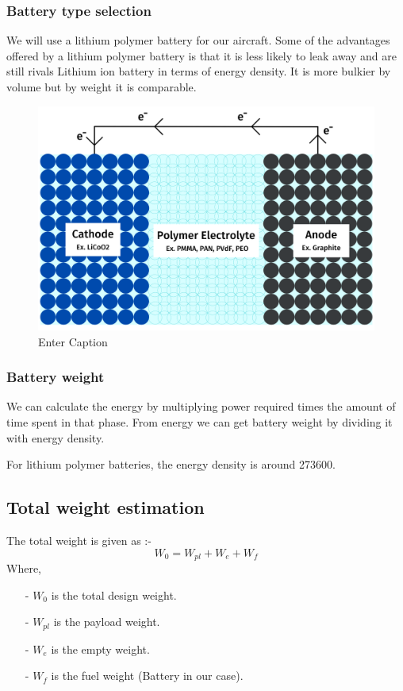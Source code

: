 \documentclass[12 pt]{article}
\begin{document}
\subsubsection{Battery type selection \cite{Lipobattery}}

We will use a lithium polymer battery for our aircraft. Some of the advantages offered by a lithium polymer battery is that it is less likely to leak away and are still rivals Lithium ion battery in terms of energy density. It is more bulkier by volume but by weight it is comparable.

\begin{figure}[h]
    \centering
    \includegraphics[width=0.5\linewidth]{Extra pics/LiPo_battery_diagram.png}
    \caption{Enter Caption}
    \label{fig:enter-label}
\end{figure}

\subsubsection{Battery weight}

We can calculate the energy by multiplying power required times the amount of time spent in that phase. From energy we can get battery weight by dividing it with energy density. 

For lithium polymer batteries, the energy density is around 273600.

\subsection{Total weight estimation}

The total weight is given as :- 
$$ W_0 = W_{pl} + W_{e} + W_{f} $$
Where,
\begin{itemize}
    \item[-] $W_0$ is the total design weight.
    \item [-] $W_{pl}$ is the payload weight.
    \item [-] $W_{e}$ is the empty weight.
    \item [-] $W_{f}$ is the fuel weight (Battery in our case).
\end{itemize}
\end{document}
